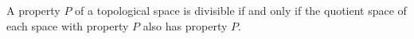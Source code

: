 A property $P$ of a topological space is divisible if and only if the quotient space of each space with property $P$ also has property $P$.

